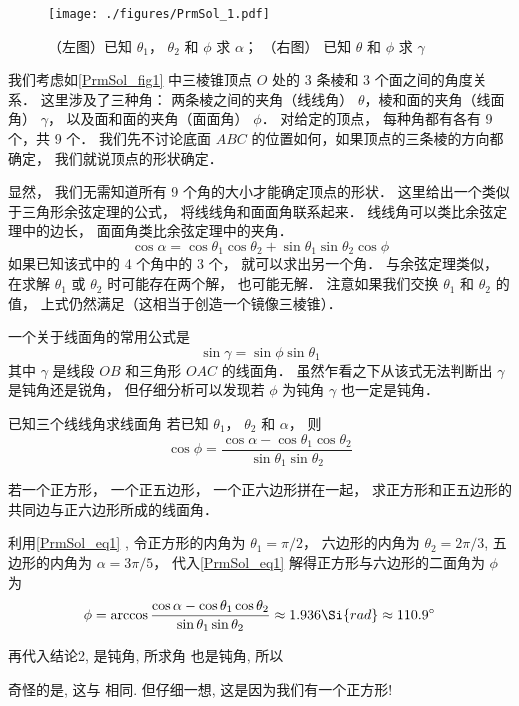 


\begin{figure}[ht]
\centering
\texttt{[image: ./figures/PrmSol\_1.pdf]}
\caption{（左图）已知 $\theta_1$， $\theta_2$ 和 $\phi$ 求 $\alpha$； （右图） 已知 $\theta$ 和 $\phi$ 求 $\gamma$} \label{PrmSol_fig1}
\end{figure}

我们考虑如\autoref{PrmSol_fig1} 中三棱锥顶点 $O$ 处的 3 条棱和 3 个面之间的角度关系． 这里涉及了三种角： 两条棱之间的夹角（线线角） $\theta$，棱和面的夹角（线面角） $\gamma$， 以及面和面的夹角（面面角） $\phi$． 对给定的顶点， 每种角都有各有 9 个，共 9 个． 我们先不讨论底面 $ABC$ 的位置如何，如果顶点的三条棱的方向都确定， 我们就说顶点的形状确定．

显然， 我们无需知道所有 9 个角的大小才能确定顶点的形状． 这里给出一个类似于三角形余弦定理的公式， 将线线角和面面角联系起来． 线线角可以类比余弦定理中的边长， 面面角类比余弦定理中的夹角．
\begin{equation}\label{PrmSol_eq1}
\cos\alpha = \cos\theta_1 \cos\theta_2 + \sin\theta_1 \sin\theta_2 \cos\phi
\end{equation}
如果已知该式中的 4 个角中的 3 个， 就可以求出另一个角． 与余弦定理类似， 在求解 $\theta_1$ 或 $\theta_2$ 时可能存在两个解， 也可能无解． 注意如果我们交换 $\theta_1$ 和 $\theta_2$ 的值， 上式仍然满足（这相当于创造一个镜像三棱锥）．

一个关于线面角的常用公式是
\begin{equation}\label{PrmSol_eq2}
\sin\gamma = \sin\phi\sin\theta_1
\end{equation}
其中 $\gamma$ 是线段 $OB$ 和三角形 $OAC$ 的线面角． 虽然乍看之下从该式无法判断出 $\gamma$ 是钝角还是锐角， 但仔细分析可以发现若 $\phi$ 为钝角 $\gamma$ 也一定是钝角．

\begin{example}{已知三个线线角求线面角}
若已知 $\theta_1$， $\theta_2$ 和 $\alpha$， 则
\begin{equation}
\cos\phi = \frac{\cos\alpha - \cos\theta_1 \cos\theta_2}{\sin\theta_1 \sin\theta_2}
\end{equation}
\end{example}

\begin{example}{}
若一个正方形， 一个正五边形， 一个正六边形拼在一起， 求正方形和正五边形的共同边与正六边形所成的线面角．

利用\autoref{PrmSol_eq1} , 令正方形的内角为 $\theta_1 = \pi/2$， 六边形的内角为 $\theta_2 = 2\pi/3$, 五边形的内角为 $\alpha = 3\pi/5$， 代入\autoref{PrmSol_eq1} 解得正方形与六边形的二面角为 $\phi$ 为
\begin{equation}
\phi = \arccos\frac{\cos\alpha - \cos\theta_1 \cos\theta_2}{\sin\theta_1\sin\theta_2} \approx 1.936\Si{rad} \approx 110.9^\circ
\end{equation}

 
再代入结论2,  是钝角, 所求角 也是钝角, 所以
 
奇怪的是, 这与 相同. 但仔细一想, 这是因为我们有一个正方形!
\end{example}


